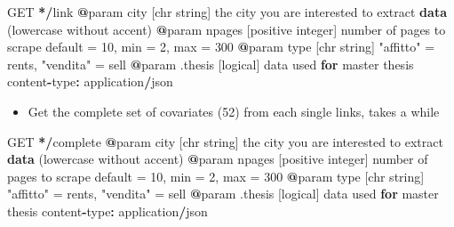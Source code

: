 \documentclass[
  12pt,
  a4paper,
  oneside]{book}
\newenvironment{Shaded}{\begin{snugshade}}{\end{snugshade}}
\newcommand{\ControlFlowTok}[1]{\textcolor[rgb]{0.13,0.29,0.53}{\textbf{#1}}}
\newcommand{\DecValTok}[1]{\textcolor[rgb]{0.00,0.00,0.81}{#1}}
\newcommand{\ErrorTok}[1]{\textcolor[rgb]{0.64,0.00,0.00}{\textbf{#1}}}
\newcommand{\KeywordTok}[1]{\textcolor[rgb]{0.13,0.29,0.53}{\textbf{#1}}}
\newcommand{\NormalTok}[1]{#1}
\newcommand{\OperatorTok}[1]{\textcolor[rgb]{0.81,0.36,0.00}{\textbf{#1}}}
\newcommand{\StringTok}[1]{\textcolor[rgb]{0.31,0.60,0.02}{#1}}
\providecommand{\tightlist}{%
  \setlength{\itemsep}{0pt}\setlength{\parskip}{0pt}}
\theoremstyle{definition}
\theoremstyle{definition}
\theoremstyle{definition}
\theoremstyle{remark}
\begin{document}
\begin{Shaded}
\begin{Highlighting}[]
\NormalTok{      GET }\OperatorTok{*}\ErrorTok{/}\NormalTok{link}
      \OperatorTok{@}\NormalTok{param city [chr string] the city you are interested to extract }\KeywordTok{data}\NormalTok{ (lowercase without accent)}
      \OperatorTok{@}\NormalTok{param npages [positive integer] number of pages to scrape default =}\StringTok{ }\DecValTok{10}\NormalTok{, min  =}\StringTok{ }\DecValTok{2}\NormalTok{, max =}\StringTok{ }\DecValTok{300}
      \OperatorTok{@}\NormalTok{param type [chr string] }\StringTok{"affitto"}\NormalTok{ =}\StringTok{ }\NormalTok{rents, }\StringTok{"vendita"}\NormalTok{  =}\StringTok{ }\NormalTok{sell }
      \OperatorTok{@}\NormalTok{param .thesis [logical] data used }\ControlFlowTok{for}\NormalTok{ master thesis}
\NormalTok{      content}\OperatorTok{-}\NormalTok{type}\OperatorTok{:}\StringTok{ }\NormalTok{application}\OperatorTok{/}\NormalTok{json }
\end{Highlighting}
\end{Shaded}

\begin{itemize}
\tightlist
\item
  Get the complete set of covariates (52) from each single links, takes a while
\end{itemize}

\begin{Shaded}
\begin{Highlighting}[]
\NormalTok{      GET }\OperatorTok{*}\ErrorTok{/}\NormalTok{complete}
      \OperatorTok{@}\NormalTok{param city [chr string] the city you are interested to extract }\KeywordTok{data}\NormalTok{ (lowercase without accent)}
      \OperatorTok{@}\NormalTok{param npages [positive integer] number of pages to scrape default =}\StringTok{ }\DecValTok{10}\NormalTok{, min  =}\StringTok{ }\DecValTok{2}\NormalTok{, max =}\StringTok{ }\DecValTok{300}
      \OperatorTok{@}\NormalTok{param type [chr string] }\StringTok{"affitto"}\NormalTok{ =}\StringTok{ }\NormalTok{rents, }\StringTok{"vendita"}\NormalTok{  =}\StringTok{ }\NormalTok{sell }
      \OperatorTok{@}\NormalTok{param .thesis [logical] data used }\ControlFlowTok{for}\NormalTok{ master thesis}
\NormalTok{      content}\OperatorTok{-}\NormalTok{type}\OperatorTok{:}\StringTok{ }\NormalTok{application}\OperatorTok{/}\NormalTok{json}
\end{Highlighting}
\end{Shaded}
\end{document}

